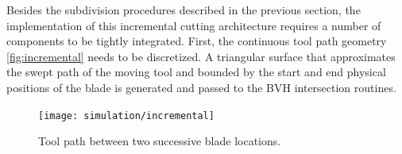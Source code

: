 
Besides the subdivision procedures described in the previous section, the implementation of this incremental cutting architecture requires a number of components to be tightly integrated. First, the continuous tool path geometry \eg \autoref{fig:incremental} needs to be discretized. A triangular surface that approximates the swept path of the moving tool and bounded by the start and end physical positions of the blade is generated and passed to the BVH intersection routines.

\begin{figure}
	\centering%
	\texttt{[image: simulation/incremental]}
	\caption{Tool path between two successive blade locations.}\label{fig:incremental}
\end{figure}


